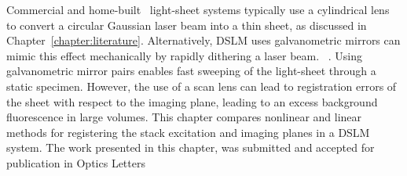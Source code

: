 Commercial and home-built~\cite{pitrone_openspim:_2013} light-sheet systems typically use a cylindrical lens to convert a circular Gaussian laser beam into a thin sheet, as discussed in Chapter~\ref{chapter:literature}.
Alternatively, \gls{DSLM} uses galvanometric mirrors can mimic this effect mechanically by rapidly dithering a laser beam. %
~\cite{keller_fast_2010-1}.
Using galvanometric mirror pairs enables fast sweeping of the \gls{light-sheet} through a static specimen.
However, the use of a scan lens can lead to registration errors of the sheet with respect to the imaging plane, leading to an excess background fluorescence in large volumes.
This chapter compares nonlinear and linear methods for registering the stack excitation and imaging planes in a \gls{DSLM} system.
The work presented in this chapter, was submitted and accepted for publication in Optics Letters~\cite{russellHomographicallyGeneratedLight2018}
\pagebreak


